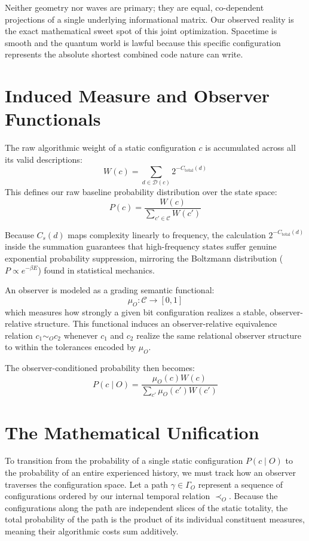 Neither geometry nor waves are primary; they are equal, co-dependent projections of a single underlying informational matrix.
Our observed reality is the exact mathematical sweet spot of this joint optimization.
Spacetime is smooth and the quantum world is lawful because this specific configuration represents the absolute shortest combined code nature can write.



\section{Induced Measure and Observer Functionals}

The raw algorithmic weight of a static configuration $c$ is accumulated across all its valid descriptions:
\[
W(c) = \sum_{d \in \mathcal{D}(c)} 2^{-C_{\text{total}}(d)}
\]
This defines our raw baseline probability distribution over the state space:
\[
P(c) = \frac{W(c)}{\sum_{c'\in\mathcal{C}} W(c')}
\]

Because $C_s(d)$ maps complexity linearly to frequency, the calculation $2^{-C_{\text{total}}(d)}$ inside the summation guarantees that high-frequency states suffer genuine exponential probability suppression, mirroring the Boltzmann distribution ($P \propto e^{-\beta E}$) found in statistical mechanics.

An observer is modeled as a grading semantic functional:
\[
\mu_O : \mathcal{C} \to [0,1]
\]
which measures how strongly a given bit configuration realizes a stable, observer-relative structure.
This functional induces an observer-relative equivalence relation $c_1 \sim_O c_2$ whenever $c_1$ and $c_2$ realize the same relational observer structure to within the tolerances encoded by $\mu_O$. 

The observer-conditioned probability then becomes:
\[
P(c \mid O) = \frac{\mu_O(c)W(c)}{\sum_{c'} \mu_O(c')W(c')}
\]



\section{The Mathematical Unification}

To transition from the probability of a single static configuration $P(c \mid O)$ to the probability of an entire experienced history,
we must track how an observer traverses the configuration space.
Let a path $\gamma \in \Gamma_O$ represent a sequence of configurations ordered by our internal temporal relation $\prec_O$.
Because the configurations along the path are independent slices of the static totality, the total probability of the path is the product of its individual constituent measures, meaning their algorithmic costs sum additively.

